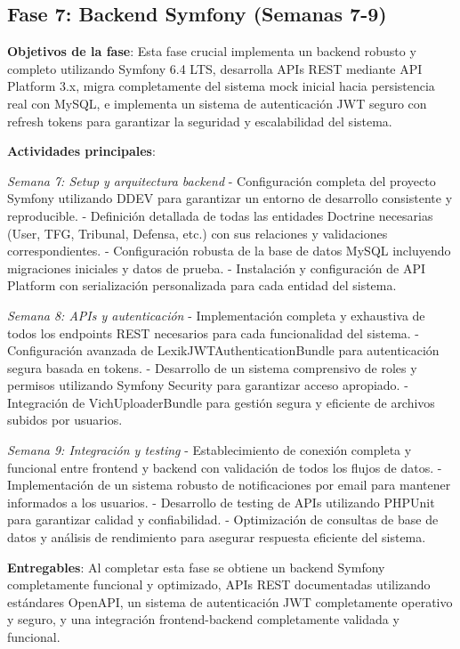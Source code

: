 \documentclass[12pt,a4paper,oneside]{report}
\begin{document}
\subsection{Fase 7: Backend Symfony (Semanas
7-9)}\label{fase-7-backend-symfony-semanas-7-9}

\textbf{Objetivos de la fase}: Esta fase crucial implementa un backend robusto y completo utilizando Symfony 6.4 LTS, desarrolla APIs REST mediante API Platform 3.x, migra completamente del sistema mock inicial hacia persistencia real con MySQL, e implementa un sistema de autenticación JWT seguro con refresh tokens para garantizar la seguridad y escalabilidad del sistema.

\textbf{Actividades principales}:

\emph{Semana 7: Setup y arquitectura backend} - Configuración completa del proyecto Symfony utilizando DDEV para garantizar un entorno de desarrollo consistente y reproducible. - Definición detallada de todas las entidades Doctrine necesarias (User, TFG, Tribunal, Defensa, etc.) con sus relaciones y validaciones correspondientes. - Configuración robusta de la base de datos MySQL incluyendo migraciones iniciales y datos de prueba. - Instalación y configuración de API Platform con serialización personalizada para cada entidad del sistema.

\emph{Semana 8: APIs y autenticación} - Implementación completa y exhaustiva de todos los endpoints REST necesarios para cada funcionalidad del sistema. - Configuración avanzada de LexikJWTAuthenticationBundle para autenticación segura basada en tokens. - Desarrollo de un sistema comprensivo de roles y permisos utilizando Symfony Security para garantizar acceso apropiado. - Integración de VichUploaderBundle para gestión segura y eficiente de archivos subidos por usuarios.

\emph{Semana 9: Integración y testing} - Establecimiento de conexión completa y funcional entre frontend y backend con validación de todos los flujos de datos. - Implementación de un sistema robusto de notificaciones por email para mantener informados a los usuarios. - Desarrollo de testing de APIs utilizando PHPUnit para garantizar calidad y confiabilidad. - Optimización de consultas de base de datos y análisis de rendimiento para asegurar respuesta eficiente del sistema.

\textbf{Entregables}: Al completar esta fase se obtiene un backend Symfony completamente funcional y optimizado, APIs REST documentadas utilizando estándares OpenAPI, un sistema de autenticación JWT completamente operativo y seguro, y una integración frontend-backend completamente validada y funcional.
\end{document}
